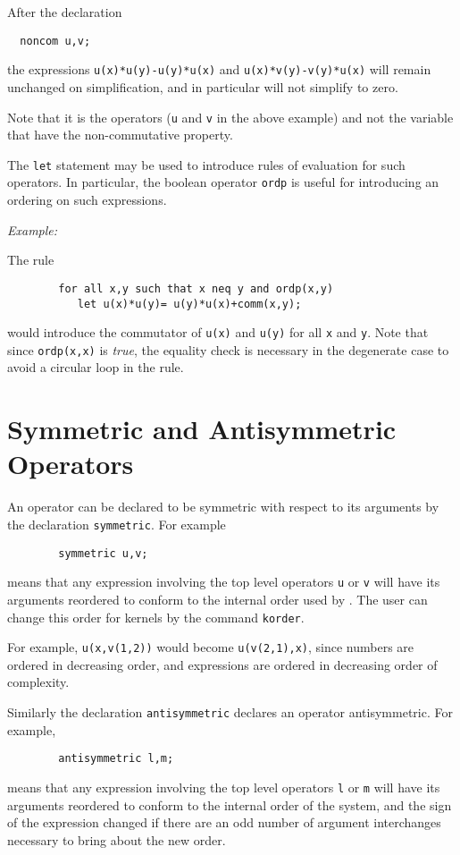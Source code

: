 After the declaration
\begin{verbatim}
  noncom u,v;
\end{verbatim}
the expressions \texttt{u(x)*u(y)-u(y)*u(x)} and \texttt{u(x)*v(y)-v(y)*u(x)} 
will remain unchanged
on simplification, and in particular will not simplify to zero.

Note that it is the operators (\texttt{u} and \texttt{v} in the above example)
and not the variable that have the non-commutative property.

The \texttt{let} statement may be used to introduce rules of
evaluation for such operators.  In particular, the boolean operator
\texttt{ordp} is useful for introducing an ordering on such
expressions.

\textit{Example:}

The rule
\begin{verbatim}
        for all x,y such that x neq y and ordp(x,y)
           let u(x)*u(y)= u(y)*u(x)+comm(x,y);
\end{verbatim}
would introduce the commutator of \texttt{u(x)} and \texttt{u(y)} for all
\texttt{x} and \texttt{y}.  Note that since \texttt{ordp(x,x)} is {\em true}, the
equality check is necessary in the degenerate case to avoid a circular
loop in the rule.

\hypertarget{reserved:SYMMETRIC}{\section{Symmetric and Antisymmetric Operators}}

An operator can be declared to be symmetric with respect to its arguments
by the declaration \texttt{symmetric}. For example
\begin{verbatim}
        symmetric u,v;
\end{verbatim}
means that any expression involving the top level operators \texttt{u} or
\texttt{v} will have its arguments reordered to conform to the internal order
used by {\REDUCE}.  The user can change this order for kernels by the
command \texttt{korder}.

For example, \texttt{u(x,v(1,2))} would become \texttt{u(v(2,1),x)}, since
numbers are ordered in decreasing order, and expressions are ordered in
decreasing order of complexity.

Similarly the declaration \texttt{antisymmetric}
declares an operator antisymmetric.   For example,
\begin{verbatim}
        antisymmetric l,m;
\end{verbatim}
means that any expression involving the top level operators \texttt{l} or
\texttt{m} will have its arguments reordered to conform to the internal order
of the system, and the sign of the expression changed if there are an odd
number of argument interchanges necessary to bring about the new order.

